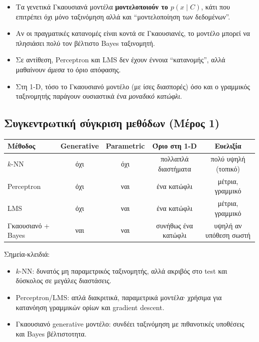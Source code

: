 \documentclass[a4paper,11pt]{article}
\begin{document}
\begin{itemize}
  \item Τα γενετικά Γκαουσιανά μοντέλα \textbf{μοντελοποιούν το $p(x\mid C)$},
        κάτι που επιτρέπει όχι μόνο ταξινόμηση αλλά και ``μοντελοποίηση των δεδομένων''.
  \item Αν οι πραγματικές κατανομές είναι κοντά σε Γκαουσιανές,
        το μοντέλο μπορεί να πλησιάσει πολύ τον βέλτιστο Bayes ταξινομητή.
  \item Σε αντίθεση, Perceptron και LMS δεν έχουν έννοια ``κατανομής'',
        αλλά μαθαίνουν \emph{άμεσα} το όριο απόφασης.
  \item Στη 1-D, τόσο το Γκαουσιανό μοντέλο (με ίσες διασπορές) όσο και ο
        γραμμικός ταξινομητής παράγουν ουσιαστικά ένα \emph{μοναδικό κατώφλι}.
\end{itemize}

\subsection{Συγκεντρωτική σύγκριση μεθόδων (Μέρος 1)}

\begin{center}
\begin{tabular}{l|c|c|c|c}
\textbf{Μέθοδος} & \textbf{Generative} & \textbf{Parametric} & \textbf{Όριο στη 1-D} & \textbf{Ευελιξία} \\
\hline
$k$-NN              & όχι   & όχι   & πολλαπλά διαστήματα & πολύ υψηλή (τοπικό) \\
Perceptron          & όχι   & ναι   & ένα κατώφλι         & μέτρια, γραμμικό \\
LMS                 & όχι   & ναι   & ένα κατώφλι         & μέτρια, γραμμικό \\
Γκαουσιανό + Bayes  & ναι   & ναι   & συνήθως ένα κατώφλι & υψηλή αν υπόθεση σωστή \\
\end{tabular}
\end{center}

Σημεία-κλειδιά:
\begin{itemize}
  \item $k$-NN: δυνατός μη παραμετρικός ταξινομητής, αλλά ακριβός στο test
        και δύσκολος σε μεγάλες διαστάσεις.
  \item Perceptron/LMS: απλά διακριτικά, παραμετρικά μοντέλα∙
        χρήσιμα για κατανόηση γραμμικών ορίων και gradient descent.
  \item Γκαουσιανό generative μοντέλο: συνδέει ταξινόμηση με
        πιθανοτικές υποθέσεις και Bayes βέλτιστοτητα.
\end{itemize}
\end{document}
